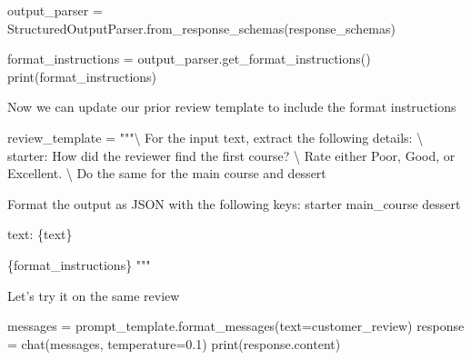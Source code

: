 \documentclass[
  letterpaper,
  DIV=11,
  numbers=noendperiod]{scrreprt}
\newenvironment{Shaded}{\begin{snugshade}}{\end{snugshade}}
\newcommand{\BuiltInTok}[1]{\textcolor[rgb]{0.00,0.23,0.31}{#1}}
\newcommand{\CharTok}[1]{\textcolor[rgb]{0.13,0.47,0.30}{#1}}
\newcommand{\FloatTok}[1]{\textcolor[rgb]{0.68,0.00,0.00}{#1}}
\newcommand{\NormalTok}[1]{\textcolor[rgb]{0.00,0.23,0.31}{#1}}
\newcommand{\OperatorTok}[1]{\textcolor[rgb]{0.37,0.37,0.37}{#1}}
\newcommand{\SpecialCharTok}[1]{\textcolor[rgb]{0.37,0.37,0.37}{#1}}
\newcommand{\StringTok}[1]{\textcolor[rgb]{0.13,0.47,0.30}{#1}}
\begin{document}
\begin{Shaded}
\begin{Highlighting}[]
\NormalTok{output\_parser }\OperatorTok{=}\NormalTok{ StructuredOutputParser.from\_response\_schemas(response\_schemas)}
\end{Highlighting}
\end{Shaded}

\begin{Shaded}
\begin{Highlighting}[]
\NormalTok{format\_instructions }\OperatorTok{=}\NormalTok{ output\_parser.get\_format\_instructions()}
\BuiltInTok{print}\NormalTok{(format\_instructions)}
\end{Highlighting}
\end{Shaded}

Now we can update our prior review template to include the format
instructions

\begin{Shaded}
\begin{Highlighting}[]
\NormalTok{review\_template }\OperatorTok{=} \StringTok{"""}\CharTok{\textbackslash{}}
\StringTok{For the input text, extract the following details: }\CharTok{\textbackslash{}}
\StringTok{starter: How did the reviewer find the first course? }\CharTok{\textbackslash{}}
\StringTok{Rate either Poor, Good, or Excellent. }\CharTok{\textbackslash{}}
\StringTok{Do the same for the main course and dessert}

\StringTok{Format the output as JSON with the following keys:}
\StringTok{starter}
\StringTok{main\_course}
\StringTok{dessert}

\StringTok{text: }\SpecialCharTok{\{text\}}

\SpecialCharTok{\{format\_instructions\}}
\StringTok{"""}
\end{Highlighting}
\end{Shaded}

Let's try it on the same review

\begin{Shaded}
\begin{Highlighting}[]
\NormalTok{messages }\OperatorTok{=}\NormalTok{ prompt\_template.format\_messages(text}\OperatorTok{=}\NormalTok{customer\_review)}
\NormalTok{response }\OperatorTok{=}\NormalTok{ chat(messages, temperature}\OperatorTok{=}\FloatTok{0.1}\NormalTok{)}
\BuiltInTok{print}\NormalTok{(response.content)}
\end{Highlighting}
\end{Shaded}
\end{document}
